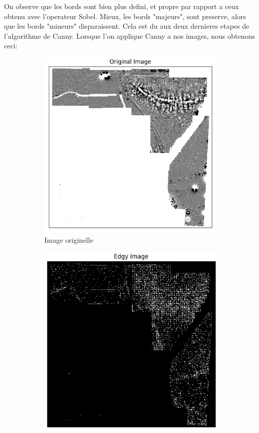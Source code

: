 \documentclass[a4paper, 12pt, titlepage, oneside]{article}
\begin{document}
	On observe que les bords sont bien plus defini, et propre par rapport a ceux obtenu avec l'operateur Sobel. Mieux, les bords "majeurs", sont preserve, alors que les bords "mineurs" disparaissent. Cela est du aux deux dernieres etapes de l'algorithme de Canny.
			Lorsque l'on applique Canny a nos images, nous obtenons ceci:
	\begin{figure}[!h]%
		\centering
		\begin{subfigure}[b]{0.4\linewidth}
			\includegraphics[width=\linewidth]{Canny1a.png}
			\caption{Image originelle}
		\end{subfigure}
		\begin{subfigure}[b]{0.4\linewidth}
			\includegraphics[width=\linewidth]{Canny1b.png}

\end{subfigure}
\end{figure}
\end{document}
